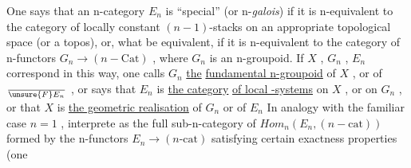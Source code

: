 One says that an n-category $E_n$ is ``special'' (or n-\textit{galois}) if it is
n-equivalent to the category of locally constant $(n-1)$-stacks on an appropriate
topological space (or a topos), or, what  be equivalent, if it is
n-equivalent to the category of n-functors $G_n \to (n - \mathrm{Cat})$ , where $G_n$ is
an n-groupoid. If $X$ , $G_n$ , $E_n$ correspond in this way, one calls $G_n$ \uline{the}
\uline{fundamental n-groupoid} of $X$ , or of $\over{\unsure{F}}{E}_n$ , or says that $E_n$ is \uline{the category}
\uline{of local -systems} on $X$ , or on $G_n$ , or that $X$ is \uline{the geometric realisation}
 of $G_n$ or of $E_n$  In analogy with the familiar case $n = 1$ ,  
 interprete  as the full sub-n-category of $\mathit{Hom}_n(E_n , (n - \mathrm{cat}))$ formed by
the n-functors $E_n \to (n\text{-}\mathrm{cat})$ satisfying certain exactness properties (one

